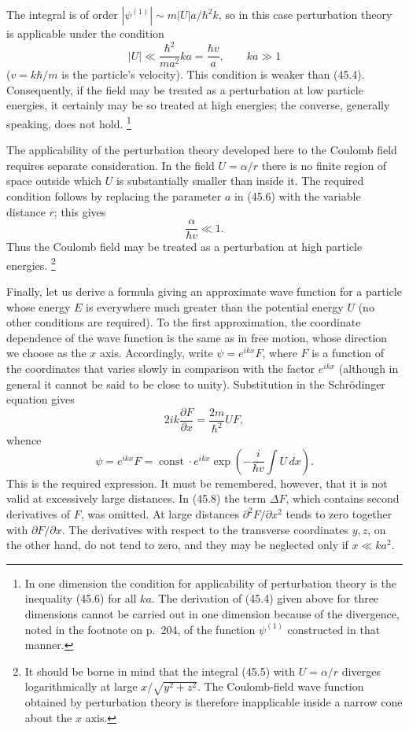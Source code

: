 The integral is of order
$|\psi^{(1)}|\sim m|U|a/\hbar^2k$, so in this case perturbation theory is
applicable under the condition
\begin{equation}
  |U|\ll\frac{\hbar^2}{ma^2}ka=\frac{\hbar v}{a},
  \qquad ka\gg1
  \tag{45.6}
\end{equation}
($v=k\hbar/m$ is the particle's velocity). This condition is weaker than
(45.4). Consequently, if the field may be treated as a perturbation at low
particle energies, it certainly may be so treated at high energies; the
converse, generally speaking, does not hold.
\footnote{In one dimension the condition for applicability of perturbation
theory is the inequality (45.6) for all $ka$. The derivation of (45.4) given
above for three dimensions cannot be carried out in one dimension because of
the divergence, noted in the footnote on p.~204, of the function
$\psi^{(1)}$ constructed in that manner.}

The applicability of the perturbation theory developed here to the Coulomb
field requires separate consideration. In the field $U=\alpha/r$ there is no
finite region of space outside which $U$ is substantially smaller than inside
it. The required condition follows by replacing the parameter $a$ in (45.6)
with the variable distance $r$; this gives
\begin{equation}
  \frac\alpha{\hbar v}\ll1.
  \tag{45.7}
\end{equation}
Thus the Coulomb field may be treated as a perturbation at high particle
energies.
\footnote{It should be borne in mind that the integral (45.5) with
$U=\alpha/r$ diverges logarithmically at large
$x/\sqrt{y^2+z^2}$. The Coulomb-field wave function obtained by perturbation
theory is therefore inapplicable inside a narrow cone about the $x$ axis.}

Finally, let us derive a formula giving an approximate wave function for a
particle whose energy $E$ is everywhere much greater than the potential
energy $U$ (no other conditions are required). To the first approximation,
the coordinate dependence of the wave function is the same as in free motion,
whose direction we choose as the $x$ axis. Accordingly, write
$\psi=e^{ikx}F$, where $F$ is a function of the coordinates that varies slowly
in comparison with the factor $e^{ikx}$ (although in general it cannot be
said to be close to unity). Substitution in the Schrödinger equation gives
\begin{equation}
  2ik\frac{\partial F}{\partial x}=\frac{2m}{\hbar^2}UF,
  \tag{45.8}
\end{equation}
whence
\begin{equation}
  \psi=e^{ikx}F=\operatorname{const}\cdot e^{ikx}
  \exp\left(-\frac{i}{\hbar v}\int U\,dx\right).
  \tag{45.9}
\end{equation}
This is the required expression. It must be remembered, however, that it is
not valid at excessively large distances. In (45.8) the term $\Delta F$,
which contains second derivatives of $F$, was omitted. At large distances
$\partial^2F/\partial x^2$ tends to zero together with
$\partial F/\partial x$. The derivatives with respect to the transverse
coordinates $y,z$, on the other hand, do not tend to zero, and they may be
neglected only if $x\ll ka^2$.

